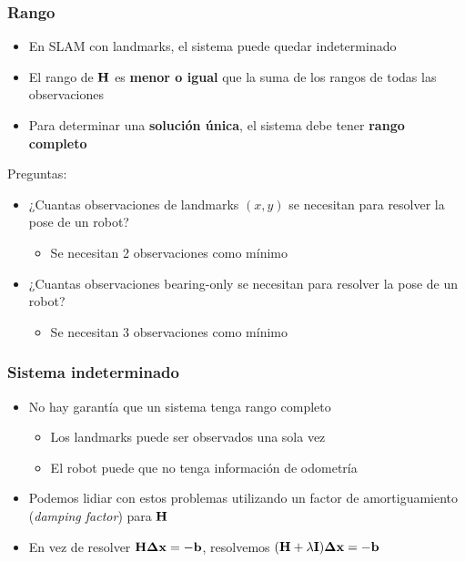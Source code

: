 \begin{frame}
    \frametitle{Rango}
    \begin{itemize}
        \item En SLAM con landmarks, el sistema puede quedar indeterminado
        \item El rango de $\boldsymbol{\mathbf{H}}$ es {\bf menor o igual} que la suma de los rangos de todas las observaciones
        \item Para determinar una {\bf solución única}, el sistema debe tener {\bf rango completo}
    \end{itemize}

     {
        Preguntas:
    }

    \begin{itemize}
        \item<2-> ¿Cuantas observaciones de landmarks $(x,y)$ se necesitan para resolver la pose de un robot?
        \begin{itemize}
            \item<3-> Se necesitan 2 observaciones como mínimo
        \end{itemize}
        \item<4-> ¿Cuantas observaciones bearing-only se necesitan para resolver la pose de un robot?
        \begin{itemize}
            \item<5-> Se necesitan 3 observaciones como mínimo
        \end{itemize}
    \end{itemize}
\end{frame}

\begin{frame}
    \frametitle{Sistema indeterminado}
    \begin{itemize}
        \item No hay garantía que un sistema tenga rango completo
        \begin{itemize}
            \item Los landmarks puede ser observados una sola vez
            \item El robot puede que no tenga información de odometría 
        \end{itemize}
        \item Podemos lidiar con estos problemas utilizando un factor de amortiguamiento (\emph{damping factor}) para $\boldsymbol{\mathbf{H}}$
        \item En vez de resolver $\boldsymbol{\mathbf{H}} \boldsymbol{\mathbf{\Delta}} \boldsymbol{\mathbf{x}} = - \boldsymbol{\mathbf{b}}$, resolvemos
        $(\boldsymbol{\mathbf{H}} + \lambda \boldsymbol{\mathbf{I}}) \boldsymbol{\mathbf{\Delta}} \boldsymbol{\mathbf{x}} = - \boldsymbol{\mathbf{b}}$
    \end{itemize}
\end{frame}

